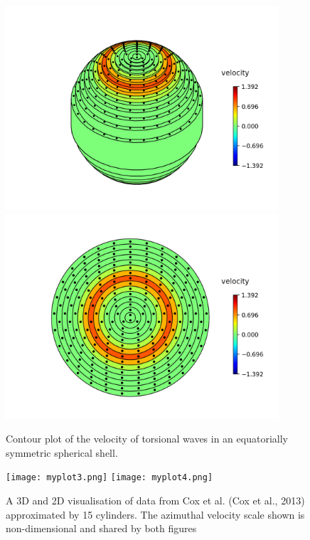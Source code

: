 \documentclass{article}
\begin{document}
\begin{figure}[H]
	    \centering
	        \includegraphics[height=3in]{myplot1.png}
		    \includegraphics[height=3in]{myplot2.png}
		        \caption{Contour plot of the velocity of torsional waves in an equatorially symmetric spherical shell.}\label{visina8}
			    
\end{figure}
\begin{figure}[H]
	    \centering
	        \texttt{[image: myplot3.png]}
		    \texttt{[image: myplot4.png]} 
		        \caption{A 3D and 2D visualisation of data from Cox et al. (Cox et al., 2013) approximated by 15 cylinders. The azimuthal velocity scale shown is non-dimensional and shared by both figures}
			     \label{fig:mesh1}
\end{figure}

    
        
\end{document}
